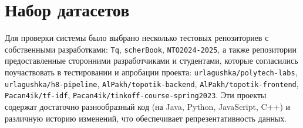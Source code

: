 \section{Набор датасетов}
Для проверки системы было выбрано несколько тестовых репозиториев с собственными разработками: \texttt{Tq}, \texttt{scherBook}, \texttt{NTO2024-2025}, а также репозитории предоставленные сторонними разработчиками и студентами, которые согласились поучаствовать в тестировании и апробации проекта: \texttt{urlagushka/polytech-labs}, \texttt{urlagushka/h8-pipeline}, \texttt{AlPakh/topotik-backend}, \texttt{AlPakh/topotik-frontend}, \texttt{Pacan4ik/tf-idf}, \texttt{Pacan4ik/tinkoff-course-spring2023}. Эти проекты содержат достаточно разнообразный код (на Java, Python, JavaScript, C++) и различную историю изменений, что обеспечивает репрезентативность данных.

